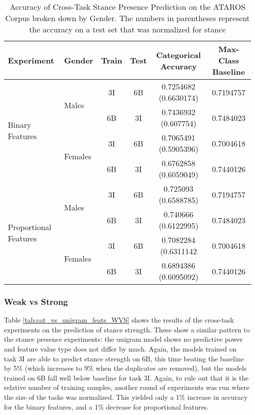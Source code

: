\begin{table}[h]
\centering
\begin{tabular}{l l c c c c}
	\textbf{Experiment} & \textbf{Gender} & \textbf{Train} & \textbf{Test} & \textbf{Categorical Accuracy} & \textbf{Max-Class Baseline} \\
	\hline
	\multirow{4}{*}{Binary Features} & 
	\multirow{2}{*}{Males} & 
		3I & 6B  & \num{0.7254682} (\num{0.6630174}) & \num{0.7194757} \\ 
		&&6B&3I  & \num{0.7436932} (\num{0.607754})  & \num{0.7484023} \\ 
	& \multirow{2}{*}{Females} & 
		3I & 6B  & \num{0.7065491} (\num{0.5905396}) & \num{0.7004618} \\ 
		&&6B&3I  & \num{0.6762858} (\num{0.6059049}) & \num{0.7440126} \\ 
	\hline
	\multirow{4}{*}{Proportional Features} & 
	\multirow{2}{*}{Males} & 
	   3I  & 6B  & \num{0.725093} (\num{0.6588785})  & \num{0.7194757} \\ 
	   &&6B&3I   & \num{0.740666} (\num{0.6122995})  & \num{0.7484023} \\ 
	& \multirow{2}{*}{Females} & 
	   3I  & 6B  & \num{0.7082284} (\num{0.6311142}  & \num{0.7004618} \\ 
	   &&6B&3I   & \num{0.6894386} (\num{0.6095092}) & \num{0.7440126} \\ 
\end{tabular}
\caption{Accuracy of Cross-Task Stance Presence Prediction on the ATAROS Corpus broken down by Gender.  The numbers in parentheses represent the accuracy on a test set that was normalized for stance}
\label{tab:cat_feats_SVN_by_gender}
\end{table}

\newpage
\subsubsection{Weak vs Strong} 

Table \ref{tab:cat_vs_unigram_feats_WVS} shows the results of the cross-task experiments on the prediction of stance strength.  These show a similar pattern to the stance presence experiments: the unigram model shows no predictive power and feature value type does not differ by much.  Again, the models trained on task 3I are able to predict stance strength on 6B, this time beating the baseline by 5\% (which increases to 9\% when the duplicates are removed), but the models trained on 6B fall well below baseline for task 3I.  Again, to rule out that it is the relative number of training samples, another round of experiments was run where the size of the tasks was normalized. This yielded only a 1\% increase in accuracy for the binary features, and a 1\% decrease for proportional features.  

